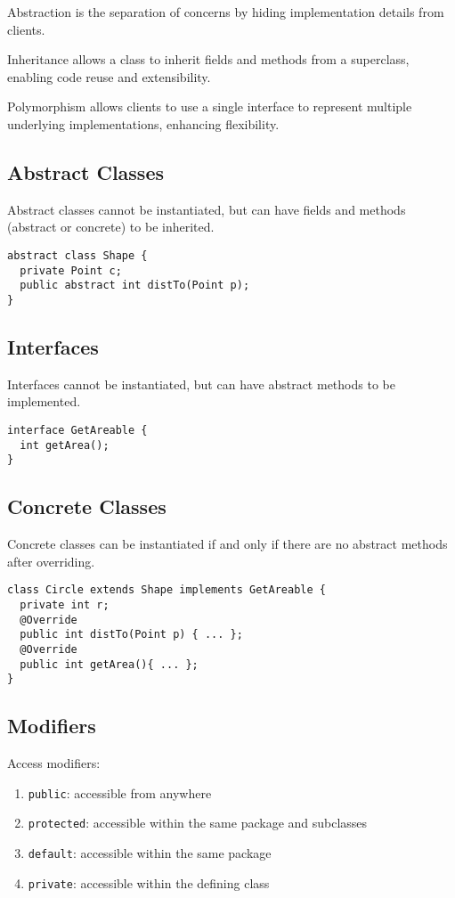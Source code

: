 \documentclass[12pt, a4paper]{article}
\begin{document}
\begin{multicols*}{3}
Abstraction is the separation of concerns by hiding implementation details from clients.

Inheritance allows a class to inherit fields and methods from a superclass, enabling code reuse and extensibility.

Polymorphism allows clients to use a single interface to represent multiple underlying implementations, enhancing flexibility.

\subsection{Abstract Classes}
Abstract classes cannot be instantiated, but can have fields and methods (abstract or concrete) to be inherited.
\begin{lstlisting}
abstract class Shape {
  private Point c;
  public abstract int distTo(Point p);
}
\end{lstlisting}

\subsection{Interfaces}
Interfaces cannot be instantiated, but can have abstract methods to be implemented.
\begin{lstlisting}
interface GetAreable {
  int getArea();
}
\end{lstlisting}

\subsection{Concrete Classes}
Concrete classes can be instantiated if and only if there are no abstract methods after overriding.
\begin{lstlisting}
class Circle extends Shape implements GetAreable {
  private int r;
  @Override
  public int distTo(Point p) { ... };
  @Override
  public int getArea(){ ... };
}
\end{lstlisting}

\subsection{Modifiers}
Access modifiers:
\begin{enumerate}[\roman*.]
  \item \lstinline|public|: accessible from anywhere
  \item \lstinline|protected|: accessible within the same package and subclasses
  \item \lstinline|default|: accessible within the same package
  \item \lstinline|private|: accessible within the defining class
\end{enumerate}


\end{multicols*}
\end{document}
